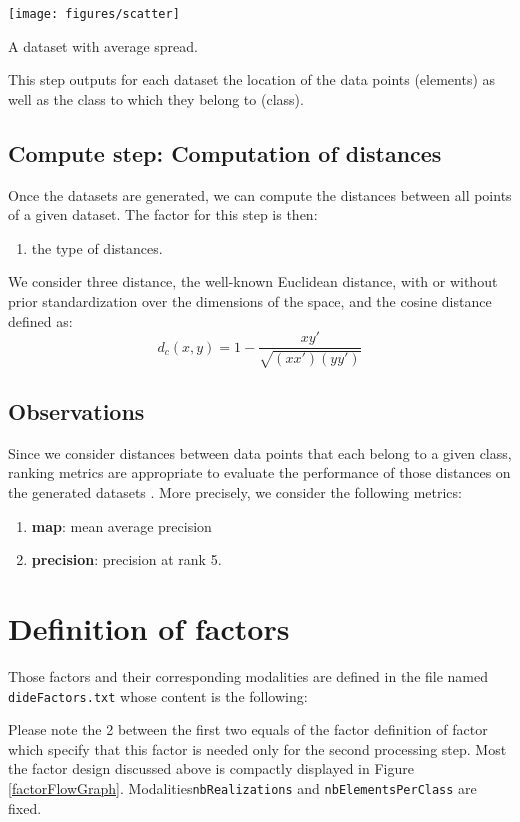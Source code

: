 \documentclass[12pt,a4paper,fleqn]{tufte-handout}
\begin{document}
\begin{marginfigure}
\texttt{[image: figures/scatter]}
\caption{A dataset with average spread.}
\label{scatter}
\end{marginfigure}

This step outputs for each dataset the location of the data points (elements) as well as the class to which they belong to (class).

\subsection{\textbf{Compute step}: Computation of distances}

Once the datasets are generated, we can compute the distances between all points of a given dataset. The factor for this step is then:
\begin{enumerate}
\item the type of distances.
\end{enumerate}

We consider three distance, the well-known Euclidean distance, with or without prior standardization over the dimensions of the space, and the cosine distance defined as:
$$
d_c(x, y) = 1-\frac{xy'}{\sqrt{(xx')(yy')}}
$$

\subsection{Observations}

Since we consider distances between data points that each belong to a given class, ranking metrics are appropriate to evaluate the performance of those distances on the generated datasets \cite{manning2008introduction}. More precisely, we consider the following metrics:
\begin{enumerate}
\item \textbf{map}: mean average precision
\item \textbf{precision}: precision at rank 5.
\end{enumerate}

\section{Definition of factors}

Those factors and their corresponding modalities are defined in the file named \texttt{dideFactors.txt} whose content is the following:


Please note the 2 between the first two equals of the factor definition of factor  which specify that this factor is needed only for the second processing step. Most the factor design discussed above is compactly displayed in Figure \ref{factorFlowGraph}. Modalities\texttt{nbRealizations} and \texttt{nbElementsPerClass} are fixed.
\end{document}
